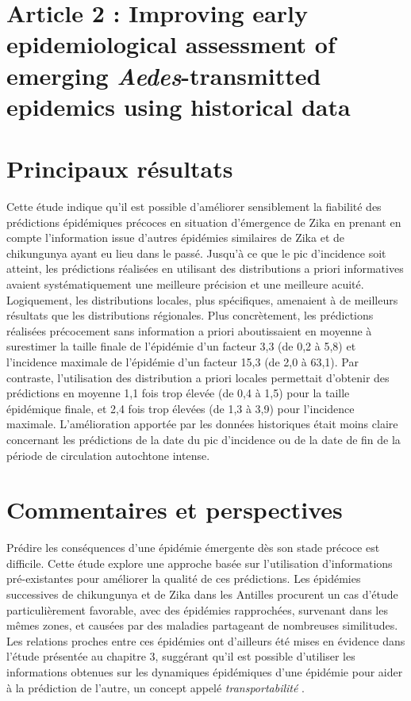 \section[Article 2]{Article 2 : \guillemotleft Improving early epidemiological assessment of emerging {\em Aedes}-transmitted epidemics using historical data\guillemotright}

%

\section{Principaux résultats}

Cette étude indique qu'il est possible d'améliorer sensiblement la fiabilité des prédictions épidémiques précoces en situation d'émergence de Zika en prenant en compte l'information issue d'autres épidémies similaires de Zika et de chikungunya ayant eu lieu dans le passé.
Jusqu'à ce que le pic d'incidence soit atteint, les prédictions réalisées en utilisant des distributions a priori informatives avaient systématiquement une meilleure précision et une meilleure acuité.
Logiquement, les distributions locales, plus spécifiques, amenaient à de meilleurs résultats que les distributions régionales.
Plus concrètement, les prédictions réalisées précocement sans information a priori aboutissaient en moyenne à surestimer la taille finale de l'épidémie d'un facteur 3,3 (de 0,2 à 5,8) et l'incidence maximale de l'épidémie d'un facteur 15,3 (de 2,0 à 63,1).
Par contraste, l'utilisation des distribution a priori locales permettait d'obtenir des prédictions en moyenne 1,1 fois trop élevée (de 0,4 à 1,5) pour la taille épidémique finale, et 2,4 fois trop élevées (de 1,3 à 3,9) pour l'incidence maximale. 
L'amélioration apportée par les données historiques était moins claire concernant les prédictions de la date du pic d'incidence ou de la date de fin de la période de circulation autochtone intense.

\section{Commentaires et perspectives}

Prédire les conséquences d'une épidémie émergente dès son stade précoce est difficile.
Cette étude explore une approche basée sur l'utilisation d'informations pré-existantes pour améliorer la qualité de ces prédictions.
Les épidémies successives de chikungunya et de Zika dans les Antilles procurent un cas d'étude particulièrement favorable, avec des épidémies rapprochées, survenant dans les mêmes zones, et causées par des maladies partageant de nombreuses similitudes.
Les relations proches entre ces épidémies ont d'ailleurs été mises en évidence dans l'étude présentée au chapitre 3, suggérant qu'il est possible d'utiliser les informations obtenues sur les dynamiques épidémiques d'une épidémie pour aider à la prédiction de l'autre, un concept appelé {\em transportabilité} \cite{pearl2014external}.

